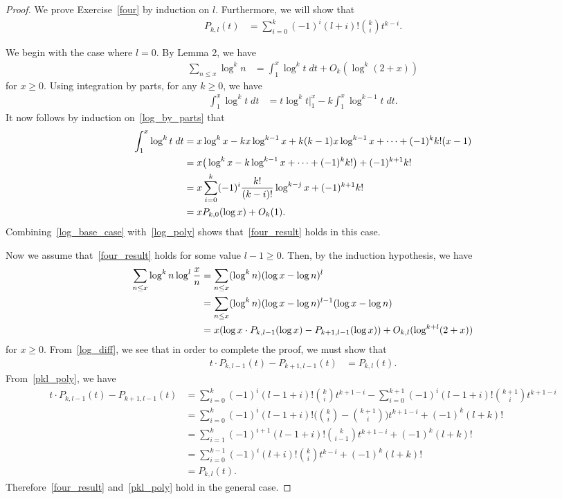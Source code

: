 \documentclass[11pt]{article}
\begin{document}
\begin{proof}
We prove Exercise~\ref{four} by induction on $l$. Furthermore, we will show that
\begin{align}
P_{k,l}(t) &= \sum_{i=0}^k(-1)^i(l+i)!\binom{k}{i}t^{k-i}.\label{pkl_poly}
\end{align}

We begin with the case where $l=0$. By Lemma 2, we have
\begin{align}
\sum_{n\leq x}\log^k{n} &= \int_1^x\log^k{t}\;dt + O_k(\log^k(2+x))\label{log_base_case}
\end{align}
for $x\geq 0$. Using integration by parts, for any $k\geq0$, we have
\begin{align}
\int_1^x\log^k{t}\;dt &= t\log^k{t}\Big\vert_1^x-k\int_1^x\log^{k-1}{t}\;dt.\label{log_by_parts}
\end{align}
It now follows by induction on~\eqref{log_by_parts} that
\begin{align}
\int_1^x\log^k{t}\;dt &= x\log^k{x}-kx\log^{k-1}{x}+k(k-1)x\log^{k-1}{x}+\cdots+(-1)^kk!(x-1)\notag\\
&= x\big(\log^k{x}-k\log^{k-1}{x}+\cdots+(-1)^kk!\big)+(-1)^{k+1}k!\notag\\
&= x\sum_{i=0}^{k}(-1)^i\frac{k!}{(k-i)!}\log^{k-j}{x}+(-1)^{k+1}k!\notag\\
&= xP_{k,0}(\log{x})+O_k(1).\label{log_poly}
\end{align}
Combining~\eqref{log_base_case} with~\eqref{log_poly} shows that~\eqref{four_result} holds in this case.

Now we assume that~\eqref{four_result} holds for some value $l-1\geq 0$. Then, by the induction hypothesis, we have
\begin{align}
\sum_{n\leq x}\log^k{n}\log^l{\frac{x}{n}} &= \sum_{n\leq x}(\log^k{n})(\log{x}-\log{n})^l\notag\\
&= \sum_{n\leq x}(\log^k{n})(\log{x}-\log{n})^{l-1}(\log{x}-\log{n})\notag\\
&= x(\log{x}\cdot P_{k,l-1}(\log{x})-P_{k+1,l-1}(\log{x}))+O_{k,l}(\log^{k+l}(2+x))\label{log_diff}
\end{align}
for $x\geq 0$. From~\eqref{log_diff}, we see that in order to complete the proof, we must show that
\begin{align*}
t\cdot P_{k,l-1}(t)-P_{k+1,l-1}(t) &= P_{k,l}(t).
\end{align*}
From~\eqref{pkl_poly}, we have
\begin{align*}
t\cdot P_{k,l-1}(t)-P_{k+1,l-1}(t) &= \sum_{i=0}^k(-1)^i(l-1+i)!\binom{k}{i}t^{k+1-i}-\sum_{i=0}^{k+1}(-1)^i(l-1+i)!\binom{k+1}{i}t^{k+1-i}\\
&= \sum_{i=0}^k(-1)^i(l-1+i)!\bigg(\binom{k}{i}-\binom{k+1}{i}\bigg)t^{k+1-i}+(-1)^k(l+k)!\\
&= \sum_{i=1}^k(-1)^{i+1}(l-1+i)!\binom{k}{i-1}t^{k+1-i}+(-1)^k(l+k)!\\
&= \sum_{i=0}^{k-1}(-1)^i(l+i)!\binom{k}{i}t^{k-i}+(-1)^k(l+k)!\\
&= P_{k,l}(t).
\end{align*}
Therefore~\eqref{four_result} and~\eqref{pkl_poly} hold in the general case.
\end{proof}
\end{document}
